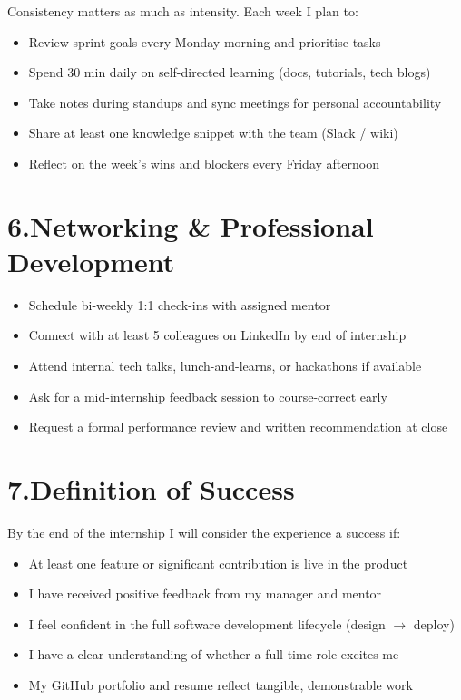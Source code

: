 \documentclass[12pt,a4paper]{article}
\begin{document}
Consistency matters as much as intensity. Each week I plan to:
\begin{itemize}[leftmargin=1.4em, itemsep=2pt]
  \item Review sprint goals every Monday morning and prioritise tasks
  \item Spend 30 min daily on self-directed learning (docs, tutorials, tech blogs)
  \item Take notes during standups and sync meetings for personal accountability
  \item Share at least one knowledge snippet with the team (Slack / wiki)
  \item Reflect on the week's wins and blockers every Friday afternoon
\end{itemize}

\section{6.\quad Networking \& Professional Development}

\begin{itemize}[leftmargin=1.4em, itemsep=2pt]
  \item Schedule bi-weekly 1:1 check-ins with assigned mentor
  \item Connect with at least 5 colleagues on LinkedIn by end of internship
  \item Attend internal tech talks, lunch-and-learns, or hackathons if available
  \item Ask for a mid-internship feedback session to course-correct early
  \item Request a formal performance review and written recommendation at close
\end{itemize}

\section{7.\quad Definition of Success}

By the end of the internship I will consider the experience a success if:
\begin{itemize}[leftmargin=1.4em, itemsep=2pt]
  \item At least one feature or significant contribution is live in the product
  \item I have received positive feedback from my manager and mentor
  \item I feel confident in the full software development lifecycle (design $\to$ deploy)
  \item I have a clear understanding of whether a full-time role excites me
  \item My GitHub portfolio and resume reflect tangible, demonstrable work
\end{itemize}
\end{document}
